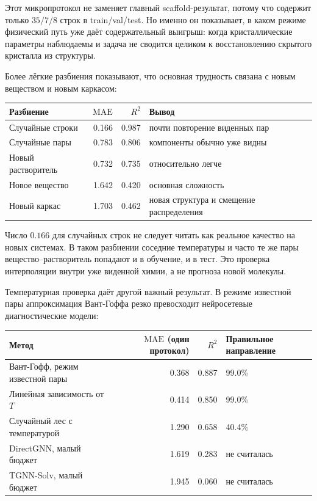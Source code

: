 \documentclass[11pt]{article}
\newcommand{\mae}{\mathrm{MAE}}
\newcommand{\Rtwo}{R^2}
\theoremstyle{definition}
\begin{document}
Этот микропротокол не заменяет главный scaffold-результат, потому что содержит только $35/7/8$ строк в train/val/test. Но именно он показывает, в каком режиме физический путь уже даёт содержательный выигрыш: когда кристаллические параметры наблюдаемы и задача не сводится целиком к восстановлению скрытого кристалла из структуры.

Более лёгкие разбиения показывают, что основная трудность связана с новым веществом и новым каркасом:
\begin{center}
\small
\begin{tabular}{lrrl}
\toprule
Разбиение & $\mae$ & $\Rtwo$ & Вывод \\
\midrule
Случайные строки & 0.166 & 0.987 & почти повторение виденных пар \\
Случайные пары & 0.783 & 0.806 & компоненты обычно уже видны \\
Новый растворитель & 0.732 & 0.735 & относительно легче \\
Новое вещество & 1.642 & 0.420 & основная сложность \\
Новый каркас & 1.703 & 0.462 & новая структура и смещение распределения \\
\bottomrule
\end{tabular}
\end{center}

Число $0.166$ для случайных строк не следует читать как реальное качество на новых системах. В таком разбиении соседние температуры и часто те же пары вещество--растворитель попадают и в обучение, и в тест. Это проверка интерполяции внутри уже виденной химии, а не прогноза новой молекулы.

Температурная проверка даёт другой важный результат. В режиме известной пары аппроксимация Вант-Гоффа резко превосходит нейросетевые диагностические модели:
\begin{center}
\small
\begin{tabular}{lrrl}
\toprule
Метод & $\mae$ (один протокол) & $\Rtwo$ & Правильное направление \\
\midrule
Вант-Гофф, режим известной пары & 0.368 & 0.887 & 99.0\% \\
Линейная зависимость от $T$ & 0.414 & 0.850 & 99.0\% \\
Случайный лес с температурой & 1.290 & 0.658 & 40.4\% \\
DirectGNN, малый бюджет & 1.619 & 0.283 & не считалась \\
TGNN-Solv, малый бюджет & 1.945 & 0.060 & не считалась \\
\bottomrule
\end{tabular}
\end{center}
\end{document}

